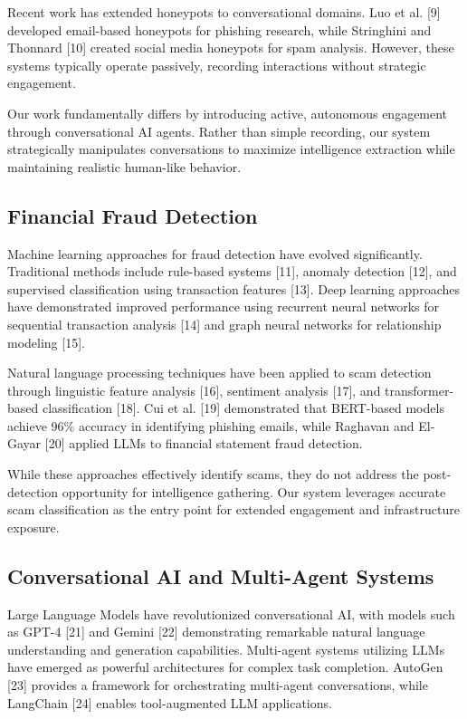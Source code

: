\documentclass[conference]{IEEEtran}
\begin{document}
Recent work has extended honeypots to conversational domains. Luo et al. [9] developed email-based honeypots for phishing research, while Stringhini and Thonnard [10] created social media honeypots for spam analysis. However, these systems typically operate passively, recording interactions without strategic engagement.

Our work fundamentally differs by introducing active, autonomous engagement through conversational AI agents. Rather than simple recording, our system strategically manipulates conversations to maximize intelligence extraction while maintaining realistic human-like behavior.

\subsection{Financial Fraud Detection}

Machine learning approaches for fraud detection have evolved significantly. Traditional methods include rule-based systems [11], anomaly detection [12], and supervised classification using transaction features [13]. Deep learning approaches have demonstrated improved performance using recurrent neural networks for sequential transaction analysis [14] and graph neural networks for relationship modeling [15].

Natural language processing techniques have been applied to scam detection through linguistic feature analysis [16], sentiment analysis [17], and transformer-based classification [18]. Cui et al. [19] demonstrated that BERT-based models achieve 96\% accuracy in identifying phishing emails, while Raghavan and El-Gayar [20] applied LLMs to financial statement fraud detection.

While these approaches effectively identify scams, they do not address the post-detection opportunity for intelligence gathering. Our system leverages accurate scam classification as the entry point for extended engagement and infrastructure exposure.

\subsection{Conversational AI and Multi-Agent Systems}

Large Language Models have revolutionized conversational AI, with models such as GPT-4 [21] and Gemini [22] demonstrating remarkable natural language understanding and generation capabilities. Multi-agent systems utilizing LLMs have emerged as powerful architectures for complex task completion. AutoGen [23] provides a framework for orchestrating multi-agent conversations, while LangChain [24] enables tool-augmented LLM applications.
\end{document}
